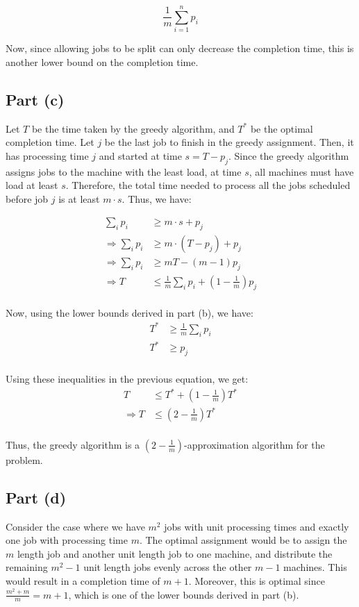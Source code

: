 \documentclass[a4paper]{article}
\begin{document}
\[ \frac{1}{m} \sum_{i=1}^{n} p_i \]

\noindent
Now, since allowing jobs to be split can only decrease the completion time, this is another lower bound on the completion time.

\vspace{0.2in}
\subsection*{Part (c)}
Let $T$ be the time taken by the greedy algorithm, and $T^*$ be the optimal completion time. Let $j$ be the last job to finish in the greedy assignment. Then, it has processing time $j$ and started at time $s = T - p_j$. Since the greedy algorithm assigns jobs to the machine with the least load, at time $s$, all machines must have load at least $s$. Therefore, the total time needed to process all the jobs scheduled before job $j$ is at least $m \cdot s$. Thus, we have:

\begin{align*}
\sum_i p_i & \geq m \cdot s + p_j \\
\Rightarrow \sum_i p_i & \geq m \cdot (T - p_j) + p_j \\
\Rightarrow \sum_i p_i & \geq mT - (m - 1)p_j \\
\Rightarrow T & \leq \frac{1}{m} \sum_i p_i + \left(1 - \frac{1}{m}\right) p_j \\
\end{align*}

\noindent
Now, using the lower bounds derived in part (b), we have:
\begin{align*}
T^* & \geq \frac{1}{m} \sum_i p_i \\
T^* & \geq p_j \\
\end{align*}

\noindent
Using these inequalities in the previous equation, we get:
\begin{align*}
T & \leq T^* + \left(1 - \frac{1}{m}\right) T^* \\
\Rightarrow T & \leq \left(2 - \frac{1}{m}\right) T^* \\
\end{align*}

\noindent
Thus, the greedy algorithm is a $(2 - \frac{1}{m})$-approximation algorithm for the problem.

\vspace{0.2in}
\subsection*{Part (d)}
Consider the case where we have $m^2$ jobs with unit processing times and exactly one job with processing time $m$. The optimal assignment would be to assign the $m$ length job and another unit length job to one machine, and distribute the remaining $m^2 - 1$ unit length jobs evenly across the other $m - 1$ machines. This would result in a completion time of $m + 1$. Moreover, this is optimal since $\frac{m^2 + m}{m} = m + 1$, which is one of the lower bounds derived in part (b).\\
\end{document}
